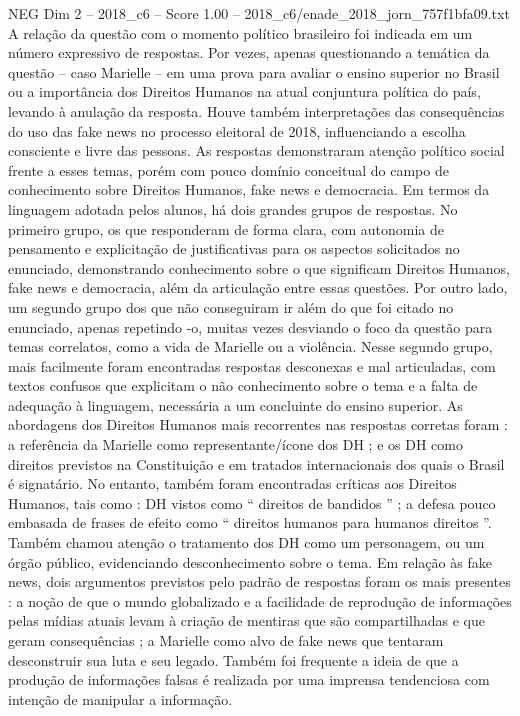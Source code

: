\begin{textsample}{NEG Dim 2 – 2018\_c6 – Score 1.00 – 2018\_c6/enade\_2018\_jorn\_757f1bfa09.txt}
A relação da questão com o momento político brasileiro foi indicada em um número expressivo de respostas.
Por vezes, apenas questionando a temática da questão – caso Marielle – em uma prova para avaliar o ensino superior no Brasil ou a importância dos Direitos Humanos na atual conjuntura política do país, levando à anulação da resposta.
Houve também interpretações das consequências do uso das fake news no processo eleitoral de 2018, influenciando a escolha consciente e livre das pessoas.
As respostas demonstraram atenção político social frente a esses temas, porém com pouco domínio conceitual do campo de conhecimento sobre Direitos Humanos, fake news e democracia.
Em termos da linguagem adotada pelos alunos, há dois grandes grupos de respostas.
No primeiro grupo, os que responderam de forma clara, com autonomia de pensamento e explicitação de justificativas para os aspectos solicitados no enunciado, demonstrando conhecimento sobre o que significam Direitos Humanos, fake news e democracia, além da articulação entre essas questões.
Por outro lado, um segundo grupo dos que não conseguiram ir além do que foi citado no enunciado, apenas repetindo -o, muitas vezes desviando o foco da questão para temas correlatos, como a vida de Marielle ou a violência.
Nesse segundo grupo, mais facilmente foram encontradas respostas desconexas e mal articuladas, com textos confusos que explicitam o não conhecimento sobre o tema e a falta de adequação à linguagem, necessária a um concluinte do ensino superior.
As abordagens dos Direitos Humanos mais recorrentes nas respostas corretas foram : a referência da Marielle como representante/ícone dos DH ; e os DH como direitos previstos na Constituição e em tratados internacionais dos quais o Brasil é signatário.
No entanto, também foram encontradas críticas aos Direitos Humanos, tais como : DH vistos como “ direitos de bandidos ” ; a defesa pouco embasada de frases de efeito como “ direitos humanos para humanos direitos ”.
Também chamou atenção o tratamento dos DH como um personagem, ou um órgão público, evidenciando desconhecimento sobre o tema.
Em relação às fake news, dois argumentos previstos pelo padrão de respostas foram os mais presentes : a noção de que o mundo globalizado e a facilidade de reprodução de informações pelas mídias atuais levam à criação de mentiras que são compartilhadas e que geram consequências ; a Marielle como alvo de fake news que tentaram desconstruir sua luta e seu legado.
Também foi frequente a ideia de que a produção de informações falsas é realizada por uma imprensa tendenciosa com intenção de manipular a informação.

\end{textsample}
